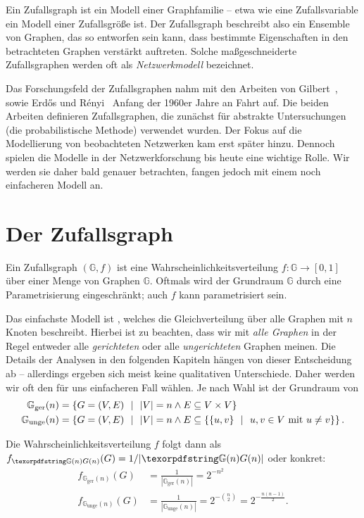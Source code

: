 Ein Zufallsgraph ist ein Modell einer Graphfamilie -- etwa wie eine Zufallsvariable ein Modell einer Zufallsgröße ist.
Der Zufallsgraph beschreibt also ein Ensemble von Graphen, das so entworfen sein kann, dass bestimmte Eigenschaften in den betrachteten Graphen verstärkt auftreten.
Solche maßgeschneiderte Zufallsgraphen werden oft als \emph{Netzwerkmodell} bezeichnet.

Das Forschungsfeld der Zufallsgraphen nahm mit den Arbeiten von Gilbert~\cite{gilbert_1959}, sowie Erd\H{o}s und R\'enyi~\cite{erdos_renyi_1960} Anfang der 1960er Jahre an Fahrt auf.
Die beiden Arbeiten definieren Zufallsgraphen, die zunächst für abstrakte Untersuchungen (\zB die probabilistische Methode) verwendet wurden.
Der Fokus auf die Modellierung von beobachteten Netzwerken kam erst später hinzu.
Dennoch spielen die Modelle in der Netzwerkforschung bis heute eine wichtige Rolle.
Wir werden sie daher bald genauer betrachten, fangen jedoch mit einem noch einfacheren Modell an.

\section{Der Zufallsgraph \Gn}
Ein Zufallsgraph $(\mathbb G, f)$ ist eine Wahrscheinlichkeitsverteilung $f\colon \mathbb G \to [0, 1]$ über einer Menge von Graphen $\mathbb G$.
Oftmals wird der Grundraum $\mathbb G$ durch eine Parametrisierung eingeschränkt; auch $f$ kann parametrisiert sein.

Das  einfachste Modell ist \Gn, welches die Gleichverteilung über alle Graphen mit $n$ Knoten beschreibt.
Hierbei ist zu beachten, dass wir mit \emph{alle Graphen} in der Regel entweder alle \emph{gerichteten} oder alle \emph{ungerichteten} Graphen meinen.
Die Details der Analysen in den folgenden Kapiteln hängen von dieser Entscheidung ab -- allerdings ergeben sich meist keine qualitativen Unterschiede.
Daher werden wir oft den für uns einfacheren Fall wählen.
Je nach Wahl ist der Grundraum von \Gn
\begin{align}
    \mathbb G_\text{ger}(n)  & =
    \left\{ G = (V,E) \ \ \middle|\ \ |V| = n \land E \subseteq V \times V \right\} \\\label{eq:gerichtet_gn}
    \mathbb G_\text{unge}(n) & =
    \left\{ G = (V,E) \ \ \middle|\ \ |V| = n \land  E \subseteq \left\{ \left\{u,v\right\} \ \ \middle|\ \ u,v \in V \text{ mit } u \ne v \right\} \right\}.
\end{align}

\noindent Die Wahrscheinlichkeitsverteilung $f$ folgt dann als $f_{\gGn}(G) = 1 / | \gGn |$ oder konkret:
\begin{align}
    f_{\mathbb G_\text{ger}(n)}(G)  & =  \frac{1}{| \mathbb G_\text{ger}(n) |} = 2^{-n^2}\label{eq:gleichverteilt_gerichtet_gn} \\
    f_{\mathbb G_\text{unge}(n)}(G) & =  \frac{1}{| \mathbb G_\text{unge}(n) |} = 2^{-\binom n 2} = 2^{-\frac{n(n-1)}{2}}.
\end{align}

